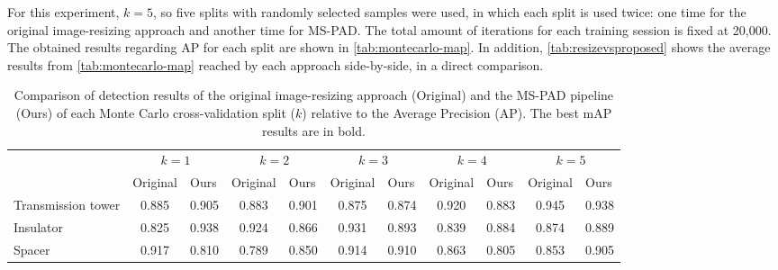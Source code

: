 \documentclass[10pt,conference]{IEEEtran}
\begin{document}
For this experiment, $k = 5$, so five splits with randomly selected samples were used, in which each split is used twice: one time for the original image-resizing approach and another time for MS-PAD. The total amount of iterations for each training session is fixed at 20,000. The obtained results regarding AP for each split are shown in \autoref{tab:montecarlo-map}. In addition, \autoref{tab:resizevsproposed} shows the average results from \autoref{tab:montecarlo-map} reached by each approach side-by-side, in a direct comparison.

\begin{table*}[htpb]
\centering
\caption{Comparison of detection results of the original image-resizing approach (Original) and the MS-PAD pipeline (Ours) of each Monte Carlo cross-validation split ($k$) relative to the Average Precision (AP). The best mAP results are in bold.}
\begin{tabular}{lcccccccccc}
\toprule
  & \multicolumn{2}{c}{$k = 1$}                       & \multicolumn{2}{c}{$k = 2$}                       & \multicolumn{2}{c}{$k = 3$}                       & \multicolumn{2}{c}{$k = 4$}                       & \multicolumn{2}{c}{$k = 5$}                       \\
  \cmidrule(lr){2-3} \cmidrule(lr){4-5} \cmidrule(lr){6-7} \cmidrule(lr){8-9} \cmidrule(lr){10-11}
                  & \multicolumn{1}{l}{Original} & \multicolumn{1}{l}{Ours} & \multicolumn{1}{l}{Original} & \multicolumn{1}{l}{Ours} & \multicolumn{1}{l}{Original} & \multicolumn{1}{l}{Ours} & \multicolumn{1}{l}{Original} & \multicolumn{1}{l}{Ours} & \multicolumn{1}{l}{Original} & \multicolumn{1}{l}{Ours} \\
\midrule
Transmission tower & 0.885                      & 0.905                    & 0.883                      & 0.901                    & 0.875                      & 0.874                    & 0.920                      & 0.883                    & 0.945                      & 0.938                    \\
Insulator          & 0.825                      & 0.938                    & 0.924                      & 0.866                    & 0.931                      & 0.893                    & 0.839                      & 0.884                    & 0.874                      & 0.889                    \\
Spacer             & 0.917                      & 0.810                    & 0.789                      & 0.850                    & 0.914                      & 0.910                    & 0.863                      & 0.805                    & 0.853                      & 0.905                    \\

\end{tabular}
\end{table*}
\end{document}
